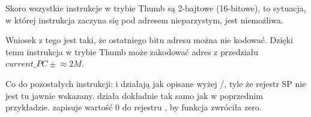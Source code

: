 Skoro wszystkie instrukcje w trybie Thumb są 2-bajtowe (16-bitowe), to sytuacja, w której instrukcja zaczyna się pod adresem nieparzystym, jest niemożliwa.

Wniosek z tego jest taki, że ostatniego bitu adresu można nie kodować.
Dzięki temu instrukcja  w trybie Thumb może zakodować adres z przedziału $current\_PC \pm{}\approx{}2M$.

Co do pozostałych instrukcji: \PUSH i \POP działają jak opisane wyżej /, tyle że rejestr \ac{SP} nie jest tu jawnie wskazany.
 działa dokładnie tak samo jak w poprzednim przykładzie.
 zapisuje wartość 0 do rejestru , by funkcja zwróciła zero.


